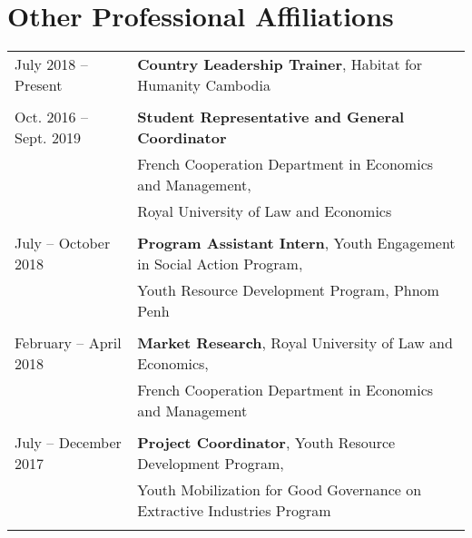 \documentclass[10pt,a4paper]{article}
\begin{document}
	  
			
	\section*{Other Professional Affiliations}
			\noindent \begin{longtable}[l]{@{} l l}
			
			\hspace{1em}
			 July 2018 -- Present & \textbf{Country Leadership Trainer}, Habitat for Humanity Cambodia \\
			& \vspace{-1em} \\
			
			\hspace{1em} 
			Oct. 2016 -- Sept. 2019 & \textbf{Student Representative and General Coordinator} \\
			& French Cooperation Department in Economics and Management, \\
			& Royal University of Law and Economics \\
			& \vspace{-1em} \\
			
			\hspace{1em} July -- October 2018 & \textbf{Program Assistant Intern}, Youth Engagement in Social Action Program, \\ 
			& Youth Resource Development Program, Phnom Penh \\
			& \vspace{-1em} \\
			
			\hspace{1em} February -- April 2018 & \textbf{Market Research}, Royal University of Law and Economics, \\ 
			& French Cooperation Department in Economics and Management \\
			& \vspace{-1em} \\
			
			\hspace{1em} July -- December 2017 & \textbf{Project Coordinator}, Youth Resource Development Program, \\ 
			&  Youth Mobilization for Good Governance on Extractive Industries Program\\
			& \vspace{-1em} \\
			

\end{longtable}
\end{document}

